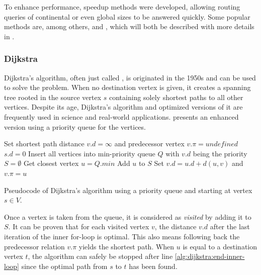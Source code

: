 		To enhance performance, speedup methods were developed, allowing routing queries of continental or even global sizes to be answered quickly.
		Some popular methods are, among others,  and , which will both be described with more details in .
		
		\subsubsection{Dijkstra}
		\label{subsubsec:dijkstra}
		
			Dijkstra's algorithm, often just called , is originated in the 1950s and can be used to solve the  problem.
			When no destination vertex is given, it creates a spanning tree rooted in the source vertex $s$ containing solely shortest paths to all other vertices.
			Despite its age, Dijkstra's algorithm and optimized versions of it are frequently used in science and real-world applications.
			 presents an enhanced version using a priority queue for the vertices\cite[658]{cormen-introduction-to-alg}.
			
			\begin{algorithm}[h]
				\begin{algorithmic}[1]
						\State Set shortest path distance $v.d = \infty$ and predecessor vertex $v.\pi = undefined$
					\EndFor
					\State $s.d = 0$
					\State Insert all vertices into min-priority queue $Q$ with $v.d$ being the priority
					\State $S = \emptyset$
						\State Get closest vertex $u = Q.min$
							\State Add $u$ to $S$
								\State Set $v.d = u.d + d(u, v)$ and $v.\pi = u$
							\EndIf
						\EndFor \label{alg:dijkstra:end-inner-loop}
					\EndWhile
				\end{algorithmic}
				\caption{Pseudocode of Dijkstra's algorithm using a priority queue and starting at vertex $s \in V$.}
				\label{alg:dijkstra}
			\end{algorithm}
			\noindent
			Once a vertex is taken from the queue, it is considered as \emph{visited} by adding it to $S$.
			It can be proven that for each visited vertex $v$, the distance $v.d$ after the last iteration of the inner for-loop is optimal\cite[659-661]{cormen-introduction-to-alg}.
			This also means following back the predecessor relation $v.\pi$ yields the shortest path.
			When $u$ is equal to a destination vertex $t$, the algorithm can safely be stopped after line \ref{alg:dijkstra:end-inner-loop} since the optimal path from $s$ to $t$ has been found.
		
